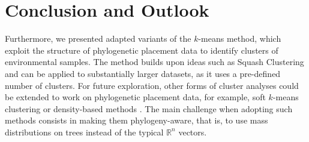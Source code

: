 \section{Conclusion and Outlook}
\label{ch:Clustering:sec:ConclusionOutlook}

Furthermore, we presented adapted variants of the $k$-means method,
which exploit the structure of phylogenetic placement data to identify clusters of environmental samples.
The method builds upon ideas such as Squash Clustering and can be applied to substantially larger datasets,
as it uses a pre-defined number of clusters.
For future exploration, other forms of cluster analyses could be extended to work on phylogenetic placement data,
for example, soft $k$-means clustering \cite{Dunn1973,Bezdek1981} or density-based methods \cite{Kriegel2011}.
The main challenge when adopting such methods consists in making them phylogeny-aware,
that is, to use mass distributions on trees instead of the typical $\mathbb{R}^n$ vectors.



